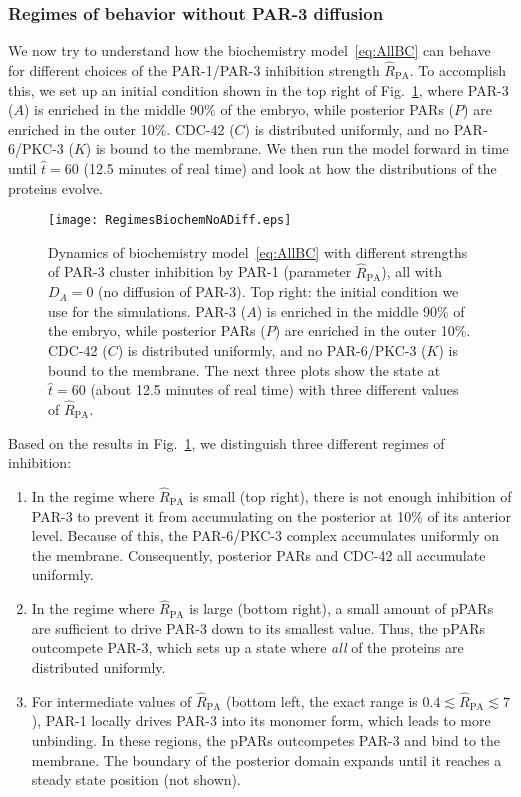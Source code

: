 \documentclass[11pt]{article}
\newcommand{\6}[1]{#1_{\text{6}}}
\newcommand{\3}[1]{#1_{\text{3}}}
\begin{document}
\subsubsection{Regimes of behavior without PAR-3 diffusion}
We now try to understand how the biochemistry model\ \eqref{eq:AllBC} can behave for different choices of the PAR-1/PAR-3 inhibition strength $\hat R_\text{PA}$. To accomplish this, we set up an initial condition shown in the top right of Fig.\ \ref{fig:BCRegimes}, where PAR-3 ($A$) is enriched in the middle 90\% of the embryo, while posterior PARs ($P$) are enriched in the outer 10\%. CDC-42 ($C$) is distributed uniformly, and no PAR-6/PKC-3 ($K$) is bound to the membrane. We then run the model forward in time until $\hat t = 60$ (12.5 minutes of real time) and look at how the distributions of the proteins evolve. 

\begin{figure}
\centering
\texttt{[image: RegimesBiochemNoADiff.eps]}
\caption{\label{fig:BCRegimes}Dynamics of biochemistry model\ \eqref{eq:AllBC} with different strengths of PAR-3 cluster inhibition by PAR-1 (parameter $\hat R_\text{PA}$), all with $D_A=0$ (no diffusion of PAR-3). Top right: the initial condition we use for the simulations. PAR-3 ($A$) is enriched in the middle 90\% of the embryo, while posterior PARs ($P$) are enriched in the outer 10\%. CDC-42 ($C$) is distributed uniformly, and no PAR-6/PKC-3 ($K$) is bound to the membrane. The next three plots show the state at $\hat t = 60$ (about 12.5 minutes of real time) with three different values of $\hat R_\text{PA}$. }
\end{figure}

Based on the results in Fig.\ \ref{fig:BCRegimes}, we distinguish three different regimes of inhibition:
\begin{enumerate}
\item In the regime where $\hat R_\text{PA}$ is small (top right), there is not enough inhibition of PAR-3 to prevent it from accumulating on the posterior at 10\% of its anterior level. Because of this, the PAR-6/PKC-3 complex accumulates uniformly on the membrane. Consequently, posterior PARs and CDC-42 all accumulate uniformly. 
\item In the regime where $\hat R_\text{PA}$ is large (bottom right), a small amount of pPARs are sufficient to drive PAR-3 down to its smallest value. Thus, the pPARs outcompete PAR-3, which sets up a state where \emph{all} of the proteins are distributed uniformly. 
\item For intermediate values of $\hat R_\text{PA}$ (bottom left, the exact range is $0.4 \lesssim \hat R_\text{PA} \lesssim 7$), PAR-1 locally drives PAR-3 into its monomer form, which leads to more unbinding. In these regions, the pPARs outcompetes PAR-3 and bind to the membrane. The boundary of the posterior domain expands until it reaches a steady state position (not shown). 
\end{enumerate}
\end{document}
